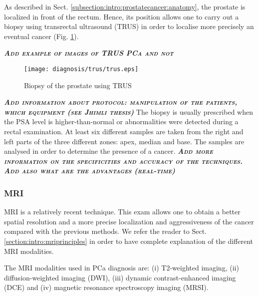 As described in Sect. \ref{subsection:intro:prostatecancer:anatomy}, the prostate is localized in front of the rectum. Hence, its position allows one to carry out a biopsy using transrectal ultrasound (TRUS) in order to localise more precisely an eventual cancer (Fig. \ref{fig:intro:prostatecancer:diagnosis:trus}).

\textbf{\textit{\textsc{Add example of images of TRUS PCa and not}}}
\begin{figure}
	\centering
	\texttt{[image: diagnosis/trus/trus.eps]}
	\caption{Biopsy of the prostate using TRUS}
	\label{fig:intro:prostatecancer:diagnosis:trus}
\end{figure}

\textbf{\textit{\textsc{Add information about protocol: manipulation of the patients, which equipment (see Jhimli thesis)}}}
The biopsy is usually prescribed when the PSA level is higher-than-normal or abnormalities were detected during a rectal examination. At least six different samples are taken from the right and left parts of the three different zones: apex, median and base. The samples are analysed in order to determine the presence of a cancer.
\textbf{\textit{\textsc{Add more information on the specificities and accuracy of the techniques. Add also what are the advantages (real-time)}}}

\subsubsection{MRI}\label{subsubsection:intro:prostatecancer:diagnosis:mri}

MRI is a relatively recent technique. This exam allows one to obtain a better spatial resolution and a more precise localization and aggressiveness of the cancer compared with the previous methods. We refer the reader to Sect. \ref{section:intro:mriprinciples} in order to have complete explanation of the different MRI modalities.

The MRI modalities used in PCa diagnosis are: (i) T2-weighted imaging, (ii) diffusion-weighted imaging (DWI\g), (iii) dynamic contrast-enhanced imaging (DCE\g) and (iv) magnetic resonance spectroscopy imaging (MRSI\g).

